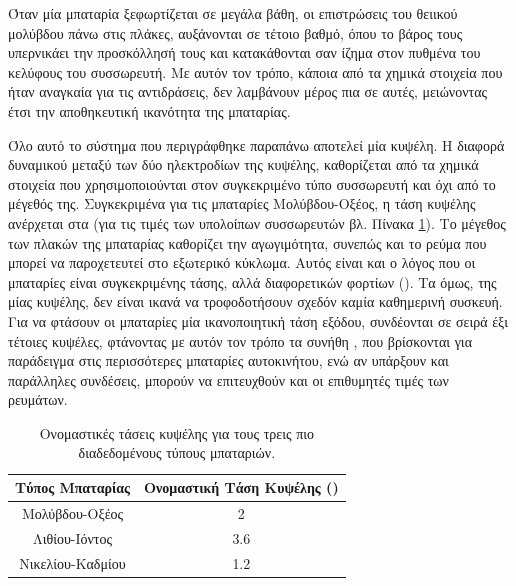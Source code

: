 \documentclass[12pt]{report}
\begin{document}
Όταν μία μπαταρία ξεφωρτίζεται σε μεγάλα βάθη, οι επιστρώσεις του θειικού μολύβδου πάνω στις πλάκες, αυξάνονται σε τέτοιο βαθμό, όπου το βάρος τους υπερνικάει την προσκόλλησή τους και κατακάθονται σαν ίζημα στον πυθμένα του κελύφους
του συσσωρευτή. Με αυτόν τον τρόπο, κάποια από τα χημικά στοιχεία που ήταν αναγκαία για τις αντιδράσεις, δεν λαμβάνουν μέρος πια σε αυτές, μειώνοντας έτσι την αποθηκευτική ικανότητα της μπαταρίας.

Όλο αυτό το σύστημα που περιγράφθηκε παραπάνω αποτελεί μία κυψέλη. Η διαφορά δυναμικού μεταξύ των δύο ηλεκτροδίων της κυψέλης, καθορίζεται από τα χημικά στοιχεία που χρησιμοποιούνται στον συγκεκριμένο τύπο συσσωρευτή και όχι
από το μέγεθός της. 
Συγκεκριμένα για τις μπαταρίες Μολύβδου-Οξέος, η τάση κυψέλης ανέρχεται στα {} (για τις τιμές των υπολοίπων συσσωρευτών βλ. Πίνακα \ref{tab:battery}). Το μέγεθος των πλακών της μπαταρίας καθορίζει 
την αγωγιμότητα, συνεπώς και το ρεύμα που μπορεί να παροχετευτεί στο εξωτερικό κύκλωμα. Αυτός είναι και ο λόγος που οι μπαταρίες είναι συγκεκριμένης τάσης, αλλά διαφορετικών φορτίων ({}). 
Τα {} όμως, της μίας κυψέλης, δεν είναι ικανά να τροφοδοτήσουν σχεδόν καμία καθημερινή συσκευή. Για να φτάσουν οι μπαταρίες μία ικανοποιητική τάση εξόδου, συνδέονται σε σειρά έξι τέτοιες κυψέλες, 
φτάνοντας με αυτόν τον τρόπο τα συνήθη {}, που βρίσκονται για παράδειγμα στις περισσότερες μπαταρίες αυτοκινήτου, ενώ αν υπάρξουν και παράλληλες συνδέσεις, μπορούν να επιτευχθούν και οι επιθυμητές τιμές των ρευμάτων.

\begin{table}[h]
\centering
				\begin{tabular}{ |c|c| }
				\hline
				Tύπος Μπαταρίας & Ονομαστική Τάση Κυψέλης ({\latintext{V}}) \\
				\hline
				Μολύβδου-Οξέος & 2 \\
				Λιθίου-Ιόντος & 3.6 \\
				Νικελίου-Καδμίου & 1.2 \\
				\hline
				\end{tabular}
\captionsetup{width=0.8\textwidth}
\caption{Ονομαστικές τάσεις κυψέλης για τους τρεις πιο διαδεδομένους τύπους μπαταριών.}
\label{tab:battery}
\end{table}
\end{document}
